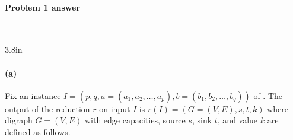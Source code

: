 

\newpage

\paragraph{Problem 1 answer}~


\noindent\begin{answerBox}{3.8in}   %

  \paragraph{(a)}  


  Fix an instance $I=(p, q, a=(a_1,a_2,\ldots,a_p), b=(b_1,b_2,\ldots,b_q))$ of  .  
  The output of the reduction $r$ on input $I$ is $r(I) = (G=(V, E), s, t, k)$ where
  digraph $G=(V,E)$ with edge capacities, source $s$, sink $t$, and value $k$ are defined as follows.

  \bigskip 

  \begin{blue}


    \REPLACEME

  \end{blue}

\end{answerBox}


